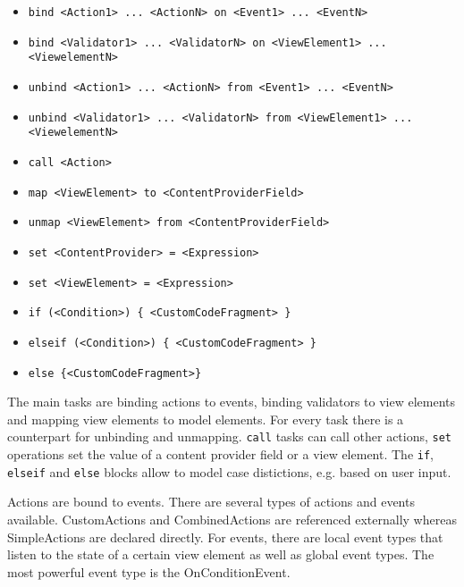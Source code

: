 \begin{itemize}
\item \lstinline!bind <Action1> ... <ActionN> on <Event1> ... <EventN>!
\item \lstinline!bind <Validator1> ... <ValidatorN> on <ViewElement1> ... <ViewelementN>!
\item \lstinline!unbind <Action1> ... <ActionN> from <Event1> ... <EventN>!
\item \lstinline!unbind <Validator1> ... <ValidatorN> from <ViewElement1> ... <ViewelementN>!
\item \lstinline!call <Action>!
\item \lstinline!map <ViewElement> to <ContentProviderField>!
\item \lstinline!unmap <ViewElement> from <ContentProviderField>!
\item \lstinline!set <ContentProvider> = <Expression>!
\item \lstinline!set <ViewElement> = <Expression>!
\item \lstinline!if (<Condition>) { <CustomCodeFragment> }!
\item \lstinline!elseif (<Condition>) { <CustomCodeFragment> }!
\item \lstinline!else {<CustomCodeFragment>}!
\end{itemize}

The main tasks are binding actions to events, binding validators to view elements and mapping view elements to model elements. For every task there is a counterpart for unbinding and unmapping. \lstinline!call! tasks can call other actions, \lstinline!set! operations set the value of a content provider field or a view element. The \lstinline!if!, \lstinline!elseif! and \lstinline!else! blocks allow to model case distictions, e.g. based on user input.

Actions are bound to events. There are several types of actions and events available. CustomActions and CombinedActions are referenced externally whereas SimpleActions are declared directly. For events, there are local event types that listen to the state of a certain view element as well as global event types. The most powerful event type is the OnConditionEvent.

